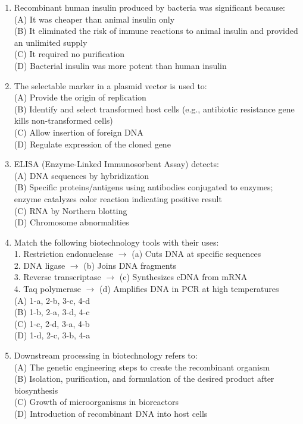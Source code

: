 \documentclass{article}
\begin{document}
\begin{enumerate}[label=Q\arabic*.]
\item Recombinant human insulin produced by bacteria was significant because:
\\(A) It was cheaper than animal insulin only
\\(B) It eliminated the risk of immune reactions to animal insulin and provided an unlimited supply
\\(C) It required no purification
\\(D) Bacterial insulin was more potent than human insulin

\item The selectable marker in a plasmid vector is used to:
\\(A) Provide the origin of replication
\\(B) Identify and select transformed host cells (e.g., antibiotic resistance gene kills non-transformed cells)
\\(C) Allow insertion of foreign DNA
\\(D) Regulate expression of the cloned gene

\item ELISA (Enzyme-Linked Immunosorbent Assay) detects:
\\(A) DNA sequences by hybridization
\\(B) Specific proteins/antigens using antibodies conjugated to enzymes; enzyme catalyzes color reaction indicating positive result
\\(C) RNA by Northern blotting
\\(D) Chromosome abnormalities

\item Match the following biotechnology tools with their uses:\\
1. Restriction endonuclease $\rightarrow$ (a) Cuts DNA at specific sequences\\
2. DNA ligase $\rightarrow$ (b) Joins DNA fragments\\
3. Reverse transcriptase $\rightarrow$ (c) Synthesizes cDNA from mRNA\\
4. Taq polymerase $\rightarrow$ (d) Amplifies DNA in PCR at high temperatures
\\(A) 1-a, 2-b, 3-c, 4-d
\\(B) 1-b, 2-a, 3-d, 4-c
\\(C) 1-c, 2-d, 3-a, 4-b
\\(D) 1-d, 2-c, 3-b, 4-a

\item Downstream processing in biotechnology refers to:
\\(A) The genetic engineering steps to create the recombinant organism
\\(B) Isolation, purification, and formulation of the desired product after biosynthesis
\\(C) Growth of microorganisms in bioreactors
\\(D) Introduction of recombinant DNA into host cells

\end{enumerate}
\end{document}
